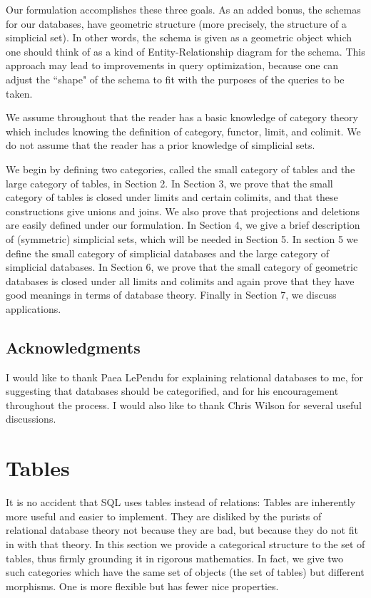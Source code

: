\documentclass{amsart}
\begin{document}
Our formulation accomplishes these three goals.  As an added bonus, the schemas for our databases, have geometric structure (more precisely, the structure of a simplicial set).  In other words, the schema is given as a geometric object which one should think of as a kind of Entity-Relationship diagram for the schema.  This approach may lead to improvements in query optimization, because one can adjust the ``shape" of the schema to fit with the purposes of the queries to be taken.

We assume throughout that the reader has a basic knowledge of category theory which includes knowing the definition of category, functor, limit, and colimit.  We do not assume that the reader has a prior knowledge of simplicial sets.

We begin by defining two categories, called the small category of tables and the large category of tables, in Section 2.  In Section 3, we prove that the small category of tables is closed under limits and certain colimits, and that these constructions give unions and joins.  We also prove that projections and deletions are easily defined under our formulation.  In Section 4, we give a brief description of (symmetric) simplicial sets, which will be needed in Section 5.  In section 5 we define the small category of simplicial databases and the large category of simplicial databases.  In Section 6, we prove that the small category of geometric databases is closed under all limits and colimits and again prove that they have good meanings in terms of database theory.  Finally in Section 7, we discuss applications.

\subsection{Acknowledgments}

I would like to thank Paea LePendu for explaining relational databases to me, for suggesting that databases should be categorified, and for his encouragement throughout the process.  I would also like to thank Chris Wilson for several useful discussions.

\section{Tables}

It is no accident that SQL uses tables instead of relations: Tables are inherently more useful and easier to implement.  They are disliked by the purists of relational database theory not because they are bad, but because they do not fit in with that theory.  In this section we provide a categorical structure to the set of tables, thus firmly grounding it in rigorous mathematics.  In fact, we give two such categories which have the same set of objects (the set of tables) but different morphisms.  One is more flexible but has fewer nice properties.
\end{document}
